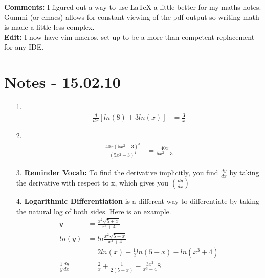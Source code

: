 \documentclass[11pt]{article}
\begin{document}
{\bf Comments:} I figured out a way to use LaTeX a little better for my maths 
notes.  Gummi (or emacs) allows for constant viewing of the pdf output so 
writing math is made a little less complex. \\
{\bf Edit:} I now have vim macros, set up to be a more than competent 
replacement for any IDE.

\section{Notes - 15.02.10}
\begin{itemize}
\item[1.]
	\begin{align*}
		\frac{d}{dx} \left[ln(8)+3ln(x)\right] &= \frac{3}{x}
	\end{align*}
\item[2.]
	\begin{align*}
		\frac{40x(5x^2-3)^3}{(5x^2-3)^4}
		&=\frac{40x}{5x^2-3}
	\end{align*}
\item[3.] {\bf Reminder Vocab:} To find the derivative implicitly, you find $\frac{dy}{dx}$ by taking the derivative with respect to x, which gives you $\left( \frac{dy}{dx} \right)$

\item[4.] {\bf Logarithmic Differentiation} is a different way to differentiate by taking the natural log of both sides.  Here is an example.
	\begin{align*}
	y &= \frac{x^2 \sqrt{5 + x}}{x^3+4}\\
	ln(y) &= ln \frac{x^2\sqrt{5 + x}}{x^3+4}\\
	&= 2ln(x) + \frac{1}{2}ln\left(5+x\right)-ln\left(x^3+4\right)\\
	\frac{1}{y}\frac{dy}{dx} &= \frac{2}{x}+\frac{1}{2(5+x)}-\frac{3x^2}{x^3+4}8
	\end{align*}
\end{itemize}
\end{document}
